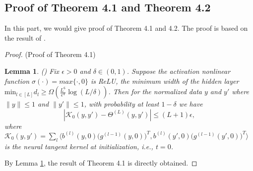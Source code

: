 \documentclass[hyperref]{article}
\numberwithin{equation}{section}
\theoremstyle{nonumberplain}
\newtheorem{proof}{Proof}
\newtheorem{lemma}{Lemma}[section]
\begin{document}
	
	\subsection{Proof of Theorem 4.1 and Theorem 4.2}
	\label{ap.proof}
	In this part, we would give proof of Theorem 4.1 and 4.2. The proof is based on the result of \cite{arora2019exact}.
	
	
	\begin{proof}(Proof of Theorem 4.1)
		
		\begin{lemma}
			()
			Fix $\epsilon>0$ and $\delta\in(0,1)$. Suppose the activation nonlinear function $\sigma(\cdot) = max\{\cdot,0\}$ is ReLU, the minimum width of the hidden layer $\text{min}_{l\in[L]}d_l\geq \Omega(\frac{L^6}{\epsilon^4}\log(L/\delta))$. Then for the normalized data $y$ and $y'$ where $\|y\|\leq1$ and $\|y'\|\leq1$, with probability at least $1-\delta$
			we have $$|\mathcal{K}_0(y,y')-\Theta^{(L)}(y,y')|\leq (L+1)\epsilon,$$
			where $\mathcal{K}_0(y,y')=\sum_l\bigl\langle b^{(l)}(y,0)\bigl(g^{(l-1)}(y,0)\bigr)^T, b^{(l)}(y',0)\bigl(g^{(l-1)}(y',0)\bigr)^T \bigl\rangle$ is the neural tangent kernel at initialization, i.e., $t=0$. 
			\label{lemma.a1}
		\end{lemma}
		
		By Lemma \ref{lemma.a1}, the result of Theorem 4.1 is directly obtained. 
	\end{proof}
	
\end{document}
